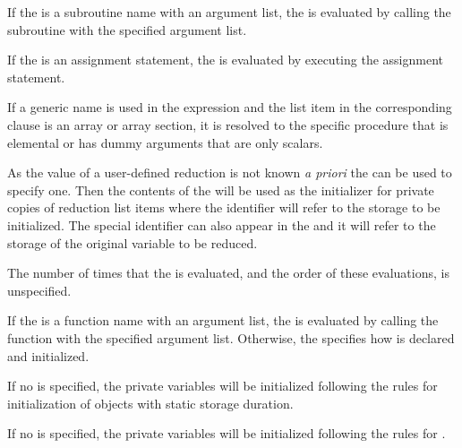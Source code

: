 \begin{fortranspecific}
If the  is a subroutine name with an argument list, the 
 is evaluated by calling the subroutine with the specified argument list.

If the  is an assignment statement, the  is 
evaluated by executing the assignment statement.

If a generic name is used in the  expression and the list item
in the corresponding  clause is an array or array section, it
is resolved to the specific procedure that is elemental or has dummy
arguments that are only scalars.
\end{fortranspecific}

As the  value of a user-defined reduction is not known 
\emph{a priori} the  can be used to specify one. Then 
the contents of the  will be used as the initializer 
for private copies of reduction list items where the  identifier 
will refer to the storage to be initialized. The special identifier 
 can also appear in the  and it will 
refer to the storage of the  original variable to be reduced.

The number of times that the  is evaluated, and the order 
of these evaluations, is unspecified.

\begin{ccppspecific}
If the  is a function name with an argument list, the 
 is evaluated by calling the function with the specified 
argument list. Otherwise, the  specifies how  
is declared and initialized.
\end{ccppspecific}

\begin{cspecific}
If no  is specified, the private variables will be initialized
following the rules for initialization of objects with static storage duration.
\end{cspecific}

\begin{cppspecific}
If no  is specified, the private variables will be 
initialized following the rules for .
\end{cppspecific}

